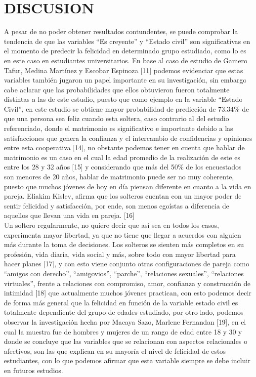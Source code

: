 \documentclass[conference]{IEEEtran}
\begin{document}
\section{DISCUSION} 
A pesar de no poder obtener resultados contundentes, se puede comprobar la tendencia de que las variables “Es creyente” y “Estado civil” son significativas en el momento de predecir la felicidad en determinado grupo estudiado, como lo es en este caso en estudiantes universitarios. En base al caso de estudio de  Gamero Tafur, Medina Martínez y Escobar Espinoza [11] podemos evidenciar que estas variables también jugaron un papel importante en su investigación, sin embargo cabe aclarar que las probabilidades que ellos obtuvieron fueron totalmente distintas a las de este estudio, puesto que como ejemplo en la variable “Estado Civil”, en este estudio se obtiene mayor probabilidad de predicción de 73.34\% de que una persona sea feliz cuando esta soltera, caso contrario al del estudio referenciado, donde el matrimonio es significativo e importante debido a las satisfacciones que genera la confianza y el intercambio de confidencias y opiniones entre esta cooperativa [14], no obstante podemos tener en cuenta que hablar de matrimonio es un caso en el cual la edad promedio de la realización de este es entre los 28 y 32 años [15] y considerando que más del 50\% de los encuestados son menores de 20 años, hablar de matrimonio puede ser no muy coherente, puesto que muchos jóvenes de hoy en día piensan diferente en cuanto a la vida en pareja. Eliakim Kislev, afirma que los solteros cuentan con un mayor poder de sentir felicidad y satisfacción, por ende, son menos egoístas a diferencia de aquellos que llevan una vida en pareja. [16]\\

   Un soltero regularmente, no quiere decir que así sea en todos los casos, experimenta mayor libertad, ya que no tiene que llegar a acuerdos con alguien más durante la toma de decisiones. Los solteros se sienten más completos en su profesión, vida diaria, vida social y más, sobre todo con mayor libertad para hacer planes [17], y con esto viene conjunto otras configuraciones de pareja  como “amigos con derecho”, “amigovios”, “parche”, “relaciones sexuales”, “relaciones virtuales”, frente a relaciones con compromiso, amor, confianza y construcción de intimidad [18] que actualmente muchos jóvenes practican, con esto podemos decir de forma más general que la felicidad en función de la variable estado civil es totalmente dependiente del grupo de edades estudiado, por otro lado, podemos observar la investigación hecha por Macaya Sazo, Marlene Fernandan [19], en el cual la muestra fue de hombres y mujeres de un rango de edad entre 18 y 30 y donde se concluye que las variables que se relacionan con aspectos relacionales o afectivos, son las que explican en su mayoría el nivel de felicidad de estos estudiantes, con lo que podemos afirmar que esta variable siempre se debe incluir en futuros estudios.\\
\end{document}
